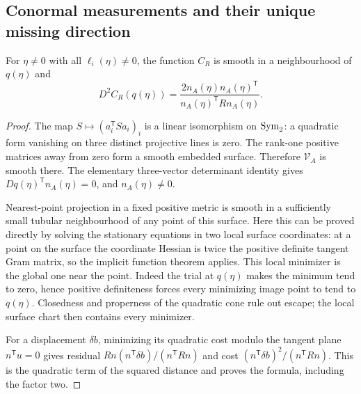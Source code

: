 \subsection{Conormal measurements and their unique missing direction}
\begin{lemma}\label{lem:contact-hessian}
For $\eta\ne0$ with all $\ell_i(\eta)\ne0$, the function $C_R$ is smooth in a neighbourhood of $q(\eta)$ and
\begin{equation}\label{eq:contact-hessian}
 D^2C_R(q(\eta))=
 \frac{2n_A(\eta)n_A(\eta)^{\mathsf T}}{n_A(\eta)^{\mathsf T}Rn_A(\eta)}.
\end{equation}
\end{lemma}
\begin{proof}
The map $S\mapsto(a_i^{\mathsf T}Sa_i)_i$ is a linear isomorphism on $\operatorname{Sym}_2$: a quadratic form vanishing on three distinct projective lines is zero. The rank-one positive matrices away from zero form a smooth embedded surface. Therefore $\mathcal V_A$ is smooth there. The elementary three-vector determinant identity gives $Dq(\eta)^{\mathsf T}n_A(\eta)=0$, and $n_A(\eta)\ne0$.

Nearest-point projection in a fixed positive metric is smooth in a sufficiently small tubular neighbourhood of any point of this surface. Here this can be proved directly by solving the stationary equations in two local surface coordinates: at a point on the surface the coordinate Hessian is twice the positive definite tangent Gram matrix, so the implicit function theorem applies. This local minimizer is the global one near the point. Indeed the trial at $q(\eta)$ makes the minimum tend to zero, hence positive definiteness forces every minimizing image point to tend to $q(\eta)$. Closedness and properness of the quadratic cone rule out escape; the local surface chart then contains every minimizer.

For a displacement $\delta b$, minimizing its quadratic cost modulo the tangent plane $n^{\mathsf T}u=0$ gives residual
$Rn(n^{\mathsf T}\delta b)/(n^{\mathsf T}Rn)$ and cost
$(n^{\mathsf T}\delta b)^2/(n^{\mathsf T}Rn)$. This is the quadratic term of the squared distance and proves the formula, including the factor two.
\end{proof}

